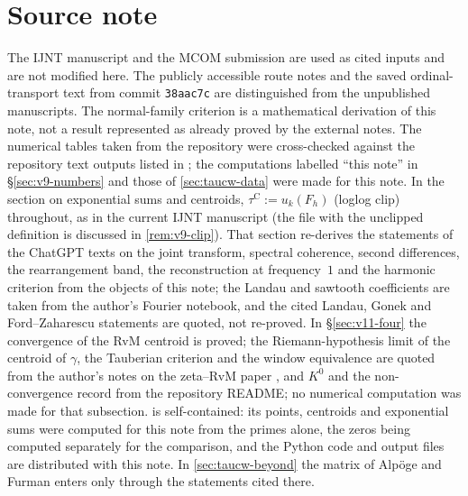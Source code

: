 \documentclass[11pt,a4paper]{article}
\numberwithin{equation}{section}
\theoremstyle{definition}
\theoremstyle{remark}
\begin{document}
\section*{Source note}
The IJNT manuscript and the MCOM submission are used as cited inputs and are not modified here. The publicly accessible route notes and the saved ordinal-transport text from commit \texttt{38aac7c} are distinguished from the unpublished manuscripts. The normal-family criterion is a mathematical derivation of this note, not a result represented as already proved by the external notes. The numerical tables taken from the repository were cross-checked against the repository text outputs listed in \cite{CasanaV9,CasanaNotes}; the computations labelled ``this note'' in \S\ref{sec:v9-numbers} and those of \cref{sec:taucw-data} were made for this note. In the section on exponential sums and centroids, $\tau^{\mathrm C}:=u_k(F_h)$ (loglog clip) throughout, as in the current IJNT manuscript (the file with the unclipped definition is discussed in \cref{rem:v9-clip}). That section re-derives the statements of the ChatGPT texts on the joint transform, spectral coherence, second differences, the rearrangement band, the reconstruction at frequency~$1$ and the harmonic criterion from the objects of this note; the Landau and sawtooth coefficients are taken from the author's Fourier notebook, and the cited Landau, Gonek and Ford--Zaharescu statements are quoted, not re-proved. In \S\ref{sec:v11-four} the convergence of the RvM centroid is proved; the Riemann-hypothesis limit of the centroid of $\gamma$, the Tauberian criterion and the window equivalence are quoted from the author's notes on the zeta--RvM paper \cite{CasanaV26}, and $K^0$ and the non-convergence record from the repository README; no numerical computation was made for that subsection.  is self-contained: its points, centroids and exponential sums were computed for this note from the primes alone, the zeros being computed separately for the comparison, and the Python code and output files are distributed with this note. In \cref{sec:taucw-beyond} the matrix of Alp\"oge and Furman \cite{AlpogeFurman2026} enters only through the statements cited there.
\end{document}

